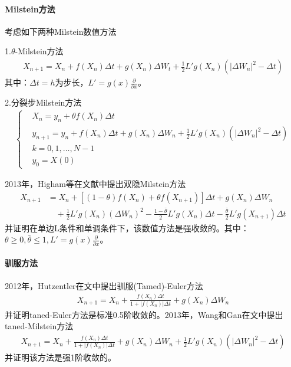         \paragraph{Milstein方法}考虑如下两种Milstein数值方法
        \par
        1.$\theta$-Milstein方法
        \begin{align*}
        X_{n+1} = X_n + f(X_n)\Delta t+ g(X_n)\Delta W_t + \frac{ 1}{2}L'g(X_n)(|\Delta W_n|^2 - \Delta t)
        \end{align*}
        其中：$\Delta t= h$为步长，$L' = g(x)\frac{\partial}{\partial x}$。
        \par
        2.分裂步Milstein方法
        \begin{align*}
            \left\{
                \begin{aligned}
                &X_n = y_n + \theta f(X_n)\Delta t\\
                &y_{n+1} = y_n + f(X_n)\Delta t+ g(X_n)\Delta W_n + \frac{1}{2}L'g(X_n)(|\Delta W_n|^2 - \Delta t)\\
                &k = 0,1,\dots,N-1\\
                &y_0 = X(0)
                \end{aligned}
            \right.
        \end{align*}
        \par
        2013年，Higham等在文献\cite{2013.Higham}中提出双隐Milstein方法
        \begin{align*}
            X_{n+1} &= X_n+[(1-\theta)f(X_n) + \theta f(X_{n+1}) ]\Delta t + g(X_n)\Delta W_n\\
            &\quad +\frac 12 L'g(X_n)(\Delta W_n)^2 - \frac{1- \bar{\theta}}{2}L'g(X_n)\Delta t - \frac{\bar{\theta}}{2}L'g(X_{n+1})\Delta t
        \end{align*}
        并证明在单边L条件和单调条件下，该数值方法是强收敛的。其中：$\theta \geqslant 0,\bar{\theta} \leqslant 1,L' = g(x)\frac{\partial}{\partial x}$。
        \paragraph{驯服方法}2012年，Hutzentler在文\cite{2012.Hutzenthaler}中提出驯服(Tamed)-Euler方法
        \begin{align*}
            X_{n+1} = X_n + \frac{f(X_n)\Delta t}{1+|f(X_n)|\Delta t} + g(X_n)\Delta W_n
        \end{align*}
        并证明taned-Euler方法是标准0.5阶收敛的。2013年，Wang和Gan在文\cite{2013.Wang}中提出taned-Milstein方法
        \begin{align*}
        X_{n+1} = X_n +\frac{f(X_n)\Delta t}{1+|f(X_n)|\Delta t} + g(X_n)\Delta W_n + \frac{1}{2}L'g(X_n)(|\Delta W_n|^2 - \Delta t)
        \end{align*}
        并证明该方法是强1阶收敛的。
